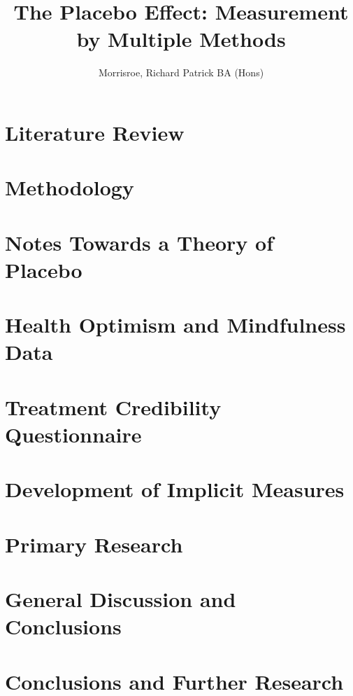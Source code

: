 \documentclass[apsych, phd]{uccthesis}
\title{The Placebo Effect: Measurement by Multiple Methods}
\author{Morrisroe, Richard Patrick BA (Hons)}
\begin{document}
\maketitle


\tableofcontents


\label{cha:intr-rese}


\chapter{Literature Review}
\label{cha:literature-review}


\chapter{Methodology}
\label{cha:methodology}



\chapter{Notes Towards a Theory of Placebo}
\label{cha:notes-towards-theory}




\chapter{Health Optimism and Mindfulness Data}
\label{cha:health-for-thesis}


\chapter{Treatment Credibility Questionnaire}
\label{cha:tcq-thesis}


\chapter{Development of Implicit Measures}
\label{cha:devel-impl-meas}


\chapter{Primary Research}
\label{cha:primary-research}


\chapter{General Discussion and Conclusions}
\label{cha:general-discussion}
\chapter{Conclusions and Further Research}
\label{cha:concl-furth-rese}




\end{document}
